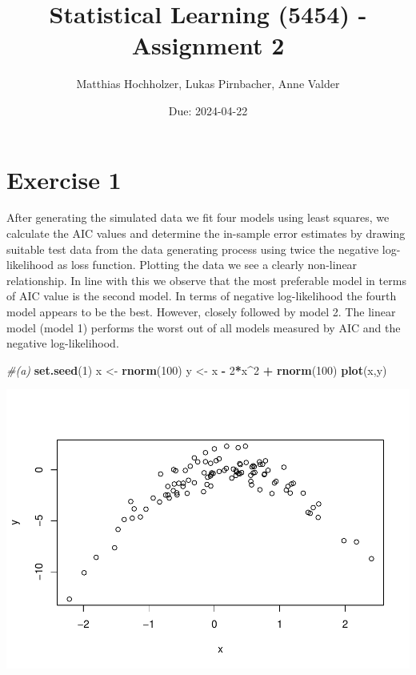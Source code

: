\documentclass[
]{article}
\title{Statistical Learning (5454) - Assignment 2}
\author{Matthias Hochholzer, Lukas Pirnbacher, Anne Valder}
\date{Due: 2024-04-22}
\newenvironment{Shaded}{\begin{snugshade}}{\end{snugshade}}
\newcommand{\CommentTok}[1]{\textcolor[rgb]{0.56,0.35,0.01}{\textit{#1}}}
\newcommand{\DecValTok}[1]{\textcolor[rgb]{0.00,0.00,0.81}{#1}}
\newcommand{\FunctionTok}[1]{\textcolor[rgb]{0.13,0.29,0.53}{\textbf{#1}}}
\newcommand{\NormalTok}[1]{#1}
\newcommand{\OtherTok}[1]{\textcolor[rgb]{0.56,0.35,0.01}{#1}}
\newcommand{\SpecialCharTok}[1]{\textcolor[rgb]{0.81,0.36,0.00}{\textbf{#1}}}
\begin{document}
\maketitle

\hypertarget{exercise-1}{%
\section{Exercise 1}\label{exercise-1}}

After generating the simulated data we fit four models using least
squares, we calculate the AIC values and determine the in-sample error
estimates by drawing suitable test data from the data generating process
using twice the negative log-likelihood as loss function. Plotting the
data we see a clearly non-linear relationship. In line with this we
observe that the most preferable model in terms of AIC value is the
second model. In terms of negative log-likelihood the fourth model
appears to be the best. However, closely followed by model 2. The linear
model (model 1) performs the worst out of all models measured by AIC and
the negative log-likelihood.

\begin{Shaded}
\begin{Highlighting}[]
\CommentTok{\#(a)}
\FunctionTok{set.seed}\NormalTok{(}\DecValTok{1}\NormalTok{)}
\NormalTok{x }\OtherTok{\textless{}{-}} \FunctionTok{rnorm}\NormalTok{(}\DecValTok{100}\NormalTok{)}
\NormalTok{y }\OtherTok{\textless{}{-}}\NormalTok{ x }\SpecialCharTok{{-}} \DecValTok{2}\SpecialCharTok{*}\NormalTok{x}\SpecialCharTok{\^{}}\DecValTok{2} \SpecialCharTok{+} \FunctionTok{rnorm}\NormalTok{(}\DecValTok{100}\NormalTok{)}
\FunctionTok{plot}\NormalTok{(x,y)}
\end{Highlighting}
\end{Shaded}

\includegraphics{A2_files/figure-latex/unnamed-chunk-3-1.pdf}
\end{document}
